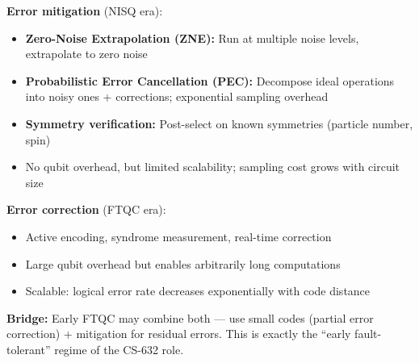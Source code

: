 \documentclass[11pt,a4paper]{article}
\begin{document}
\begin{answerbox}
\textbf{Error mitigation} (NISQ era):
\begin{itemize}
    \item \textbf{Zero-Noise Extrapolation (ZNE):} Run at multiple noise levels, extrapolate to zero noise
    \item \textbf{Probabilistic Error Cancellation (PEC):} Decompose ideal operations into noisy ones + corrections; exponential sampling overhead
    \item \textbf{Symmetry verification:} Post-select on known symmetries (particle number, spin)
    \item No qubit overhead, but limited scalability; sampling cost grows with circuit size
\end{itemize}
\textbf{Error correction} (FTQC era):
\begin{itemize}
    \item Active encoding, syndrome measurement, real-time correction
    \item Large qubit overhead but enables arbitrarily long computations
    \item Scalable: logical error rate decreases exponentially with code distance
\end{itemize}
\textbf{Bridge:} Early FTQC may combine both --- use small codes (partial error correction) + mitigation for residual errors. This is exactly the ``early fault-tolerant'' regime of the CS-632 role.
\end{answerbox}
\end{document}
